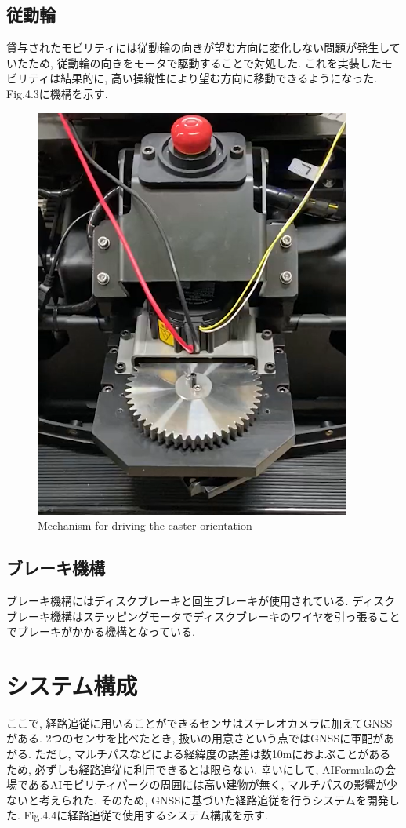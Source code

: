 \subsection{従動輪}
貸与されたモビリティには従動輪の向きが望む方向に変化しない問題が発生していたため, 従動輪の向きをモータで駆動することで対処した.
これを実装したモビリティは結果的に, 高い操縦性により望む方向に移動できるようになった.
Fig.4.3に機構を示す.


\begin{figure}[H]
  \centering
 \includegraphics[keepaspectratio, scale=0.5]
      {images/caster.png}
 \caption{Mechanism for driving the caster orientation}
 \label{fig:Mechanism for driving the caster orientation}
\end{figure}

\subsection{ブレーキ機構}
ブレーキ機構にはディスクブレーキと回生ブレーキが使用されている.
ディスクブレーキ機構はステッピングモータでディスクブレーキのワイヤを引っ張ることでブレーキがかかる機構となっている.

\section{システム構成}
ここで, 経路追従に用いることができるセンサはステレオカメラに加えてGNSSがある.
2つのセンサを比べたとき, 扱いの用意さという点ではGNSSに軍配があがる.
ただし, マルチパスなどによる経緯度の誤差は数10mにおよぶことがあるため, 必ずしも経路追従に利用できるとは限らない.
幸いにして, AIFormulaの会場であるAIモビリティパークの周囲には高い建物が無く, マルチパスの影響が少ないと考えられた.
そのため, GNSSに基づいた経路追従を行うシステムを開発した.
Fig.4.4に経路追従で使用するシステム構成を示す.

